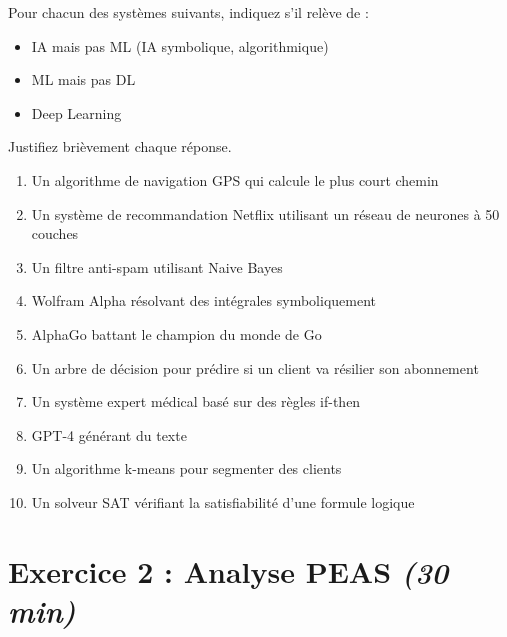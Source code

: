 \documentclass[11pt,a4paper]{article}
\begin{document}
\begin{exercicebox}[Énoncé]
Pour chacun des systèmes suivants, indiquez s'il relève de :
\begin{itemize}
    \item[(a)] IA mais pas ML (IA symbolique, algorithmique)
    \item[(b)] ML mais pas DL
    \item[(c)] Deep Learning
\end{itemize}

Justifiez brièvement chaque réponse.

\begin{enumerate}
    \item Un algorithme de navigation GPS qui calcule le plus court chemin
    \item Un système de recommandation Netflix utilisant un réseau de neurones à 50 couches
    \item Un filtre anti-spam utilisant Naive Bayes
    \item Wolfram Alpha résolvant des intégrales symboliquement
    \item AlphaGo battant le champion du monde de Go
    \item Un arbre de décision pour prédire si un client va résilier son abonnement
    \item Un système expert médical basé sur des règles if-then
    \item GPT-4 générant du texte
    \item Un algorithme k-means pour segmenter des clients
    \item Un solveur SAT vérifiant la satisfiabilité d'une formule logique
\end{enumerate}
\end{exercicebox}

\vspace{1cm}

\section*{Exercice 2 : Analyse PEAS \hfill \textit{(30 min)}}
\end{document}
